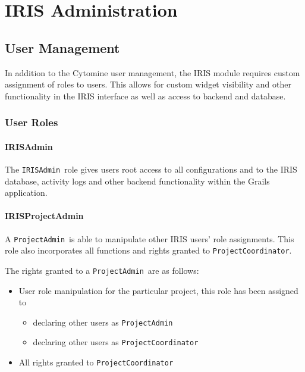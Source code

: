 \part{IRIS Administration}
\label{part:irisadmin}
{
\hypersetup{linkcolor=black}
\parttoc
}

\chapter{User Management}
In addition to the Cytomine user management, the IRIS module requires custom assignment of roles to users. 
This allows for custom widget visibility and other functionality in the IRIS interface as well as access to backend and database. 

\def\irisadmin{\texttt{IRISAdmin}}
\def\pjadmin{\texttt{ProjectAdmin}}
\def\pjcoord{\texttt{ProjectCoordinator}}
\section{User Roles}
\subsection{IRISAdmin}
The \irisadmin\ role gives users root access to all configurations and to the IRIS database, activity logs and other backend functionality within the Grails application.  

\subsection{IRISProjectAdmin}
A \pjadmin\ is able to manipulate other IRIS users' role assignments. 
This role also incorporates all functions and rights granted to \pjcoord .

The rights granted to a \pjadmin\ are as follows:
\begin{itemize}
\item User role manipulation for the particular project, this role has been assigned to
\begin{itemize}
\item declaring other users as \pjadmin
\item declaring other users as \pjcoord
\end{itemize}
\item All rights granted to \pjcoord
\end{itemize}


